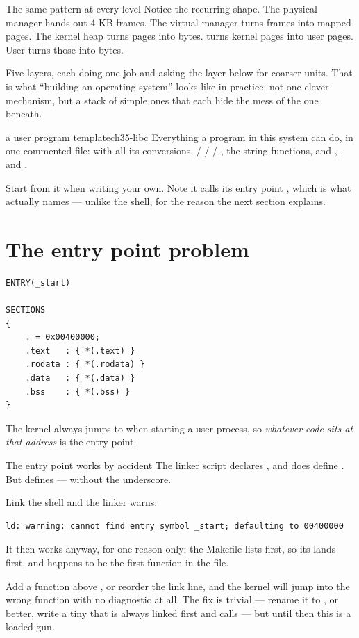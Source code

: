 \begin{concept}{The same pattern at every level}
Notice the recurring shape. The physical manager hands out 4 KB frames. The virtual manager turns
frames into mapped pages. The kernel heap turns pages into bytes.  turns kernel pages into
user pages. User  turns those into bytes.

Five layers, each doing one job and asking the layer below for coarser units. That is what
``building an operating system'' looks like in practice: not one clever mechanism, but a stack of
simple ones that each hide the mess of the one beneath.
\end{concept}

\begin{recipe}{a user program template}{ch35-libc}
Everything a program in this system can do, in one commented file:  with all its
conversions,  /  /  / , the string functions, and
, ,  and .

Start from it when writing your own. Note it calls its entry point , which is what
 actually names --- unlike the shell, for the reason the next section
explains.
\end{recipe}

\section{The entry point problem}

\begin{lstlisting}[style=txt]
ENTRY(_start)

SECTIONS
{
    . = 0x00400000;
    .text   : { *(.text) }
    .rodata : { *(.rodata) }
    .data   : { *(.data) }
    .bss    : { *(.bss) }
}
\end{lstlisting}

The kernel always jumps to  when starting a user process, so \emph{whatever code sits
at that address} is the entry point.

\begin{danger}{The entry point works by accident}
The linker script declares , and  does define
. But  defines  --- without the
underscore.

Link the shell and the linker warns:
\begin{lstlisting}[style=txt]
ld: warning: cannot find entry symbol _start; defaulting to 00400000
\end{lstlisting}
It then works anyway, for one reason only: the Makefile lists  first, so its
 lands first, and  happens to be the first function in the file.

Add a function above , or reorder the link line, and the kernel will jump into the
wrong function with no diagnostic at all. The fix is trivial --- rename it to , or
better, write a tiny  that is always linked first and calls  --- but until
then this is a loaded gun.
\end{danger}

